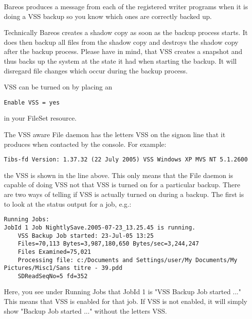 Bareos produces a message from each of the registered writer programs
when it is doing a VSS backup so you know which ones are correctly backed
up.

Technically Bareos creates a shadow copy as soon as the backup process
starts. It does then backup all files from the shadow copy and destroys the
shadow copy after the backup process. Please have in mind, that VSS
creates a snapshot and thus backs up the system at the state it had
when starting the backup. It will disregard file changes which occur during
the backup process.

VSS can be turned on by placing an

\begin{verbatim}
Enable VSS = yes
\end{verbatim}

in your FileSet resource.

The VSS aware File daemon has the letters VSS on the signon line that
it produces when contacted by the console. For example:
\begin{verbatim}
Tibs-fd Version: 1.37.32 (22 July 2005) VSS Windows XP MVS NT 5.1.2600
\end{verbatim}
the VSS is shown in the line above. This only means that the File daemon
is capable of doing VSS not that VSS is turned on for a particular backup.
There are two ways of telling if VSS is actually turned on during a backup.
The first is to look at the status output for a job, e.g.:
\footnotesize
\begin{verbatim}
Running Jobs:
JobId 1 Job NightlySave.2005-07-23_13.25.45 is running.
    VSS Backup Job started: 23-Jul-05 13:25
    Files=70,113 Bytes=3,987,180,650 Bytes/sec=3,244,247
    Files Examined=75,021
    Processing file: c:/Documents and Settings/user/My Documents/My Pictures/Misc1/Sans titre - 39.pdd
    SDReadSeqNo=5 fd=352
\end{verbatim}
\normalsize
Here, you see under Running Jobs that JobId 1 is "VSS Backup Job started ..."
This means that VSS is enabled for that job.  If VSS is not enabled, it will
simply show "Backup Job started ..." without the letters VSS.

